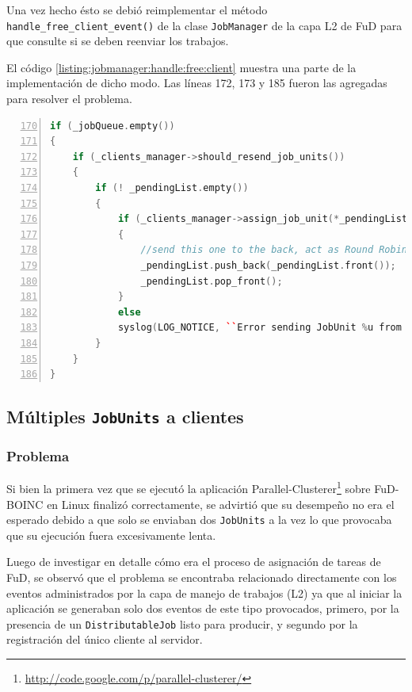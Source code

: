 Una vez hecho ésto se debió reimplementar el método \texttt{handle\_free\_client\_event()} de la clase \texttt{JobManager} de la capa L2 de FuD para que consulte si se deben reenviar los trabajos. 

El código \ref{listing:jobmanager:handle:free:client} muestra una parte de la implementación de dicho modo. Las líneas 172, 173 y 185 fueron las agregadas para resolver el problema. 
\newpage
\begin{lstlisting}[frame=shadowbox, language=C++, numbers=left, xleftmargin=8mm, framexleftmargin=22pt, basicstyle=\scriptsize, numberstyle=\footnotesize, breaklines=true, breakatwhitespace=false, captionpos=b, caption={Parte del código del método \texttt{handle\_free\_client\_event()} de la clase \texttt{JobManager}}, label=listing:jobmanager:handle:free:client, backgroundcolor=\color{gris}, firstnumber=170, tabsize=4, keywordstyle=\color{Blue}]
if (_jobQueue.empty())
{
	if (_clients_manager->should_resend_job_units()) 
	{
		if (! _pendingList.empty())
		{
			if (_clients_manager->assign_job_unit(*_pendingList.front()))
			{
				//send this one to the back, act as Round Robin
				_pendingList.push_back(_pendingList.front());
				_pendingList.pop_front();
			}
			else
			syslog(LOG_NOTICE, ``Error sending JobUnit %u from Pending List to a client.'', _pendingList.front()->get_id());
		}
	}
}
\end{lstlisting}


\subsection{Múltiples \texttt{JobUnits} a clientes}
\label{seccion:multiples:jobunits:clientes}

	\subsubsection{Problema}
Si bien la primera vez que se ejecutó la aplicación Parallel-Clusterer\footnote{\url{http://code.google.com/p/parallel-clusterer/}} sobre FuD-BOINC en Linux finalizó correctamente, se advirtió que su desempeño no era el esperado debido a que solo se enviaban dos \texttt{JobUnits} a la vez lo que provocaba que su ejecución fuera excesivamente lenta.

Luego de investigar en detalle cómo era el proceso de asignación de tareas de FuD, se observó que el problema se encontraba relacionado directamente con los eventos administrados por la capa de manejo de trabajos (L2) ya que al iniciar la aplicación se generaban solo dos eventos de este tipo provocados, primero, por la presencia de un \texttt{DistributableJob} listo para producir, y segundo por la registración del único cliente al servidor.

